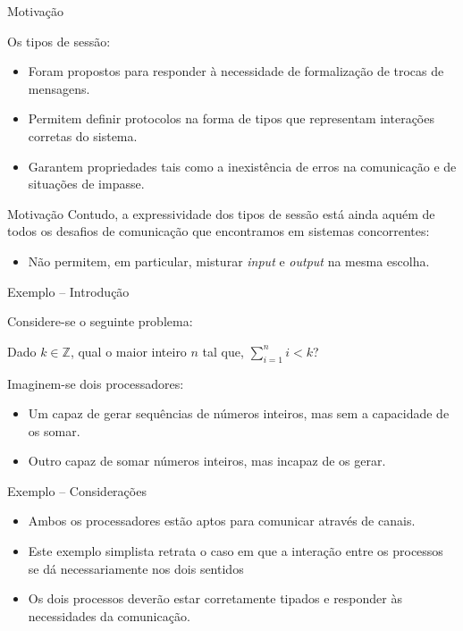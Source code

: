 \lstset{language=freest, numbers=none, escapeinside=||}

\begin{frame}[fragile]{Motivação}

  Os tipos de sessão:
  \begin{itemize}
  \item Foram propostos para responder à necessidade de formalização de trocas de mensagens.
    \pause
  \item Permitem definir protocolos na forma de tipos que representam interações corretas do sistema.
    \pause
  \item Garantem propriedades tais como a inexistência de erros na comunicação e de situações de impasse.
  \end{itemize}
\end{frame}

\begin{frame}[fragile]{Motivação}
  Contudo, a expressividade dos tipos de sessão está ainda aquém de todos os desafios de comunicação que encontramos em sistemas concorrentes:
  \vspace{3mm}
  \begin{itemize}
  \item Não permitem, em particular, misturar \textit{input} e \textit{output} na mesma escolha.
  \end{itemize}
\end{frame}

\begin{frame}[fragile]{Exemplo -- Introdução}

  Considere-se o seguinte problema:
  
  Dado $k \in \mathbb{Z}$, qual o maior inteiro $n$ tal que, $\sum_{i=1}^{n} i < k$?
  \pause
  
  Imaginem-se dois processadores:
  \begin{itemize}
  \item Um capaz de gerar sequências de números inteiros, mas sem a capacidade de os somar.
    \pause
  \item Outro capaz de somar números inteiros, mas incapaz de os gerar.
    \pause
  \end{itemize}  
\end{frame}

\begin{frame}{Exemplo -- Considerações}
  \begin{itemize}
  \item Ambos os processadores estão aptos para comunicar através de canais.
    \vspace*{2mm}
    \pause
  \item Este exemplo simplista retrata o caso em que a interação entre os processos se dá necessariamente nos dois sentidos
    \vspace*{5mm}
    \pause
  \item Os dois processos deverão estar corretamente tipados e responder às necessidades da comunicação.
  \end{itemize}
\end{frame}

